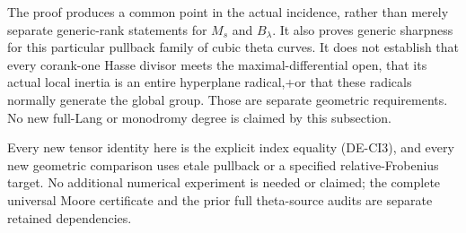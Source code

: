 \begin{remark}
\label{rem:DE-common-Cartier-incidence-scope}
The proof produces a common point in the actual incidence, rather
than merely separate generic-rank statements for \(M_s\) and
\(B_\lambda\).  It also proves generic sharpness for this particular
pullback family of cubic theta curves.  It does not establish that
every corank-one Hasse divisor meets the maximal-differential open,
that its actual local inertia is an entire hyperplane radical,+or that these radicals normally generate the global group.
Those are separate geometric requirements.  No new full-Lang or
monodromy degree is claimed by this subsection.

Every new tensor identity here is the explicit index equality
(DE-CI3), and every new geometric comparison uses etale pullback
or a specified relative-Frobenius target.  No additional numerical
experiment is needed or claimed; the complete universal Moore
certificate and the prior full theta-source audits are separate
retained dependencies.
\end{remark}
